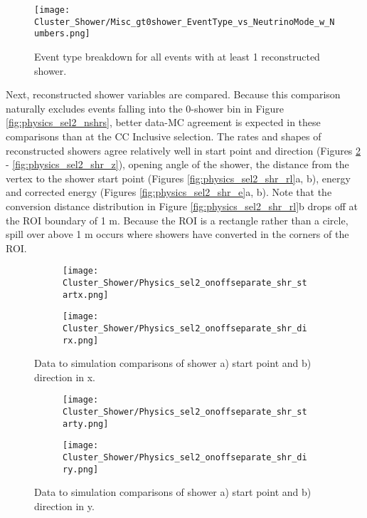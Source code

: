 \begin{figure}[H]
\centering
\texttt{[image: Cluster\_Shower/Misc\_gt0shower\_EventType\_vs\_NeutrinoMode\_w\_Numbers.png]}
\caption{ Event type breakdown for all events with at least 1 reconstructed shower. }
\label{fig:physics_gt0shower_eventtype}
\end{figure}


\par Next, reconstructed shower variables are compared. Because this comparison naturally excludes events falling into the 0-shower bin in Figure \ref{fig:physics_sel2_nshrs}, better data-MC agreement is expected in these comparisons than at the CC Inclusive selection. The rates and shapes of reconstructed showers agree relatively well in start point and direction (Figures \ref{fig:physics_sel2_shr_x} - \ref{fig:physics_sel2_shr_z}), opening angle of the shower, the distance from the vertex to the shower start point (Figures \ref{fig:physics_sel2_shr_rl}a, b), energy and corrected energy (Figures \ref{fig:physics_sel2_shr_e}a, b).  Note that the conversion distance distribution in Figure \ref{fig:physics_sel2_shr_rl}b drops off at the ROI boundary of 1 m.  Because the ROI is a rectangle rather than a circle, spill over above 1 m occurs where showers have converted in the corners of the ROI. 

\begin{figure}[H]
  \begin{subfigure}[t]{0.3\textwidth}
\texttt{[image: Cluster\_Shower/Physics\_sel2\_onoffseparate\_shr\_startx.png]}
  \caption{ }
  \end{subfigure} 
  \hspace{34mm}
  \begin{subfigure}[t]{0.3\textwidth}
\texttt{[image: Cluster\_Shower/Physics\_sel2\_onoffseparate\_shr\_dirx.png]}
  \caption{ }
  \end{subfigure} 
\caption{ Data to simulation comparisons of shower a) start point and b) direction in x.}
\label{fig:physics_sel2_shr_x}
\end{figure}


\begin{figure}[H]
  \begin{subfigure}[t]{0.3\textwidth}
\texttt{[image: Cluster\_Shower/Physics\_sel2\_onoffseparate\_shr\_starty.png]}
  \caption{ }
  \end{subfigure} 
  \hspace{34mm}
  \begin{subfigure}[t]{0.3\textwidth}
\texttt{[image: Cluster\_Shower/Physics\_sel2\_onoffseparate\_shr\_diry.png]}
  \caption{ }
  \end{subfigure} 
\caption{ Data to simulation comparisons of shower a) start point and b) direction in y.}
\label{fig:physics_sel2_shr_y}
\end{figure}


